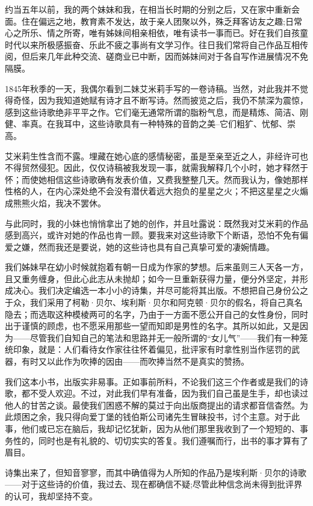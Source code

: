 {约当五年以前，我的两个妹妹和我，在相当长时期的分别之后，又在家中重新会面。住在偏远之地，教育素不发达，故于亲人团聚以外，殊乏拜客访友之趣;日常心之所乐、情之所寄，唯有姊妹间相亲相依，唯有读书一事而已。好在我们自孩童时代以来所极感振奋、乐此不疲之事尚有文学习作。往日我们常将自己作品互相传阅，但后来几年此种交流、磋商业已中断，因而姊妹间对于各自写作进展情况不免隔膜。

1845年秋季的一天，我偶尔看到二妹艾米莉手写的一卷诗稿。当然，对此我并不觉得奇怪，因为我知道她赋有诗才且不断写诗。然而披览之后，我仍不禁深为震惊，感到这些诗歌绝非平平之作。它们毫无通常所谓的脂粉气息，而是精炼、简洁、刚健、率真。在我耳中，这些诗歌具有一种特殊的音韵之美--它们粗犷、忧郁、崇高。

艾米莉生性含而不露。埋藏在她心底的感情秘密，虽是至亲至近之人，非经许可也不得贸然侵犯。因此，仅仅诗稿被我发现一事，就需我解释几个小时，她才释然于怀；而使她相信这些诗歌确有发表价值，又费我整整几天。然而我认为，像她那样性格的人，在内心深处绝不会没有潜伏着远大抱负的星星之火；不把这星星之火煽成熊熊火焰，我决不罢休。

与此同时，我的小妹也悄悄拿出了她的创作，并且吐露说：既然我对艾米莉的作品感到高兴，或许对她的作品也肯一顾。要我来对这些诗歌下个断语，恐怕不免有偏爱之嫌，然而我还是要说，她的这些诗也具有自己真挚可爱的凄婉情趣。

我们姊妹早在幼小时候就抱着有朝一日成为作家的梦想。后来虽则三人天各一方，且又重务缠身，但此心此志从未抛却；如今一旦重新获得力量，便分外坚定，并形成决心。我们决定编选一本小小的诗集，并尽可能将其出版。不想把自己身份公之于众，我们采用了柯勒·贝尔、埃利斯·贝尔和阿克顿·贝尔的假名，将自己真名隐去；而选取这种模棱两可的名字，乃由于一方面不愿公开自己的女性身份，同时出于谨慎的顾虑，也不愿采用那些一望而知即是男性的名字。其所以如此，又是因为——尽管我们自知自己的笔法和思路并无一般所谓的“女儿气”——我们有一种笼统印象，就是：人们看待女作家往往怀着偏见，批评家有时拿性别当作惩罚的武器，有时又以此作为吹捧的因由——而吹捧当然不是真实的赞扬。

我们这本小书，出版实非易事。正如事前所料，不论我们这三个作者或是我们的诗歌，都不受人欢迎。不过，对此我们早有准备，因为我们自己虽是生手，却也读过他人的甘苦之谈。最使我们困惑不解的莫过于向出版商提出的请求都音信杳然。为此烦困之余，我只得向爱丁堡的钱伯斯公司诸先生冒昧投书，讨个主意。对于此事，他们或已忘在脑后，我却记忆犹新，因为从他们那里我收到了一个短短的、事务性的，同时也是有礼貌的、切切实实的答复。我们遵嘱而行，出书的事才算有了眉目。

诗集出来了，但知音寥寥，而其中确值得为人所知的作品乃是埃利斯·贝尔的诗歌——对于这些诗的价值，我过去、现在都确信不疑;尽管此种信念尚未得到批评界的认可，我却坚持不变。

}
